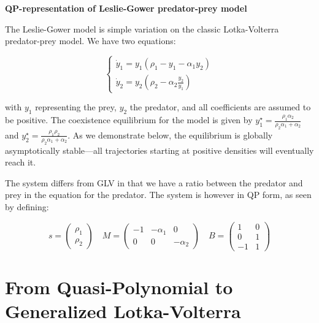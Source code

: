 \documentclass{article}
\begin{document}
\begin{cb}
\textbf{QP-representation of Leslie-Gower predator-prey model}

The Leslie-Gower model is simple variation on the classic Lotka-Volterra predator-prey model. We have two equations:

\begin{equation}
\label{eq:lg}
\begin{cases}
\dot{y}_1 = y_1 (\rho_1 - y_1- \alpha_1 y_2)\\
\dot{y}_2 = y_2 \left(\rho_2 - \alpha_2 \frac{y_2}{y_1} \right)
\end{cases}
\end{equation}

with $y_1$ representing the prey, $y_2$ the predator, and all coefficients are assumed to be positive. The coexistence equilibrium for the model is given by $y_1^\star = \frac{\rho_1 \alpha_2}{\rho_2 \alpha_1 + \alpha_2}$ and $y_2^\star = \frac{\rho_1 \rho_2}{\rho_2 \alpha_1 + \alpha_2}$. As we demonstrate below, the equilibrium is globally asymptotically stable---all trajectories starting at positive densities will eventually reach it.

The system differs from GLV in that we have a ratio between the predator and prey in the equation for the predator. The system is however in QP form, as seen by defining:

\begin{equation}
\label{eq:lgqp}
s = \begin{pmatrix}
\rho_1\\
\rho_2
\end{pmatrix} \quad 
M = \begin{pmatrix}
-1 & -\alpha_1 & 0\\
0 & 0 & -\alpha_2
\end{pmatrix} \quad
B = \begin{pmatrix}
1 & 0 \\
0 & 1 \\
-1 & 1
\end{pmatrix}
\end{equation}

\end{cb}

\hypertarget{from-quasi-polynomial-to-generalized-lotka-volterra}{%
\section{From Quasi-Polynomial to Generalized
Lotka-Volterra}\label{from-quasi-polynomial-to-generalized-lotka-volterra}}
\end{document}
